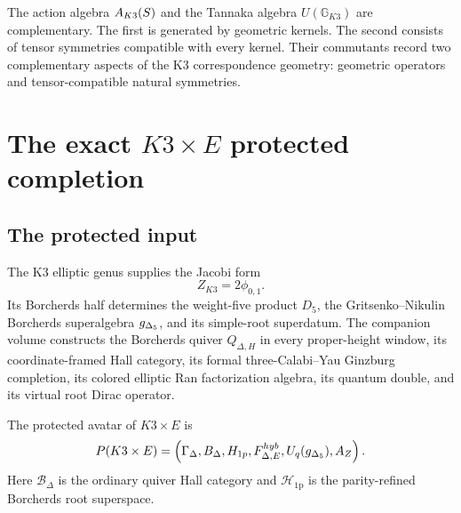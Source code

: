 The action algebra $A_{K3}(S)$ and the Tannaka algebra $U(\mathbb G_{K3})$ are complementary.  The first is generated by geometric kernels.  The second consists of tensor symmetries compatible with every kernel.  Their commutants record two complementary aspects of the K3 correspondence geometry: geometric operators and tensor-compatible natural symmetries.

\part{The exact \texorpdfstring{$K3\times E$}{K3 x E} protected completion}

\chapter{The protected input}
The K3 elliptic genus supplies the Jacobi form
\[
 Z_{K3}=2\phi_{0,1}.
\]
Its Borcherds half determines the weight-five product $D_5$, the Gritsenko--Nikulin Borcherds superalgebra ${g_{\Delta_5}}$, and its simple-root superdatum.  The companion volume constructs the Borcherds quiver $Q_{\Delta,H}$ in every proper-height window, its coordinate-framed Hall category, its formal three-Calabi--Yau Ginzburg completion, its colored elliptic Ran factorization algebra, its quantum double, and its virtual root Dirac operator.

\begin{definition}
The protected avatar of $K3\times E$ is
\[
 P(K3\times E)=
 \left(
 \Gamma_\Delta,
 B_\Delta,
 H_{1p},
 F^{hyb}_{\Delta,E},
 U_q({g_{\Delta_5}}),
 A_Z
 \right).
\]
Here $\mathcal B_\Delta$ is the ordinary quiver Hall category and $\mathcal H_{\mathrm{1p}}$ is the parity-refined Borcherds root superspace.
\end{definition}

